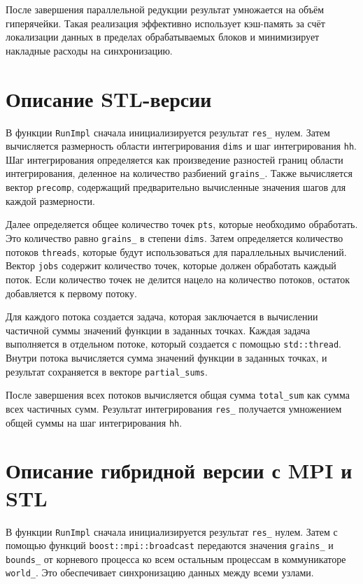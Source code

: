 \documentclass[12pt,a4paper]{extarticle}
\begin{document}
После завершения параллельной редукции результат умножается на объём гиперячейки. Такая реализация эффективно использует кэш-память за счёт локализации данных в пределах обрабатываемых блоков и минимизирует накладные расходы на синхронизацию.

\newpage
\section{Описание STL-версии}
В функции \texttt{RunImpl} сначала инициализируется результат \texttt{res\_} нулем. Затем вычисляется размерность области интегрирования \texttt{dims} и шаг интегрирования \texttt{hh}. Шаг интегрирования определяется как произведение разностей границ области интегрирования, деленное на количество разбиений \texttt{grains\_}. Также вычисляется вектор \texttt{precomp}, содержащий предварительно вычисленные значения шагов для каждой размерности.

Далее определяется общее количество точек \texttt{pts}, которые необходимо обработать. Это количество равно \texttt{grains\_} в степени \texttt{dims}. Затем определяется количество потоков \texttt{threads}, которые будут использоваться для параллельных вычислений. Вектор \texttt{jobs} содержит количество точек, которые должен обработать каждый поток. Если количество точек не делится нацело на количество потоков, остаток добавляется к первому потоку.

Для каждого потока создается задача, которая заключается в вычислении частичной суммы значений функции в заданных точках. Каждая задача выполняется в отдельном потоке, который создается с помощью \texttt{std::thread}. Внутри потока вычисляется сумма значений функции в заданных точках, и результат сохраняется в векторе \texttt{partial\_sums}.

После завершения всех потоков вычисляется общая сумма \texttt{total\_sum} как сумма всех частичных сумм. Результат интегрирования \texttt{res\_} получается умножением общей суммы на шаг интегрирования \texttt{hh}.

\newpage
\section{Описание гибридной версии с MPI и STL}

В функции \texttt{RunImpl} сначала инициализируется результат \texttt{res\_} нулем. Затем с помощью функций \texttt{boost::mpi::broadcast} передаются значения \texttt{grains\_} и \texttt{bounds\_} от корневого процесса ко всем остальным процессам в коммуникаторе \texttt{world\_}. Это обеспечивает синхронизацию данных между всеми узлами.
\end{document}
